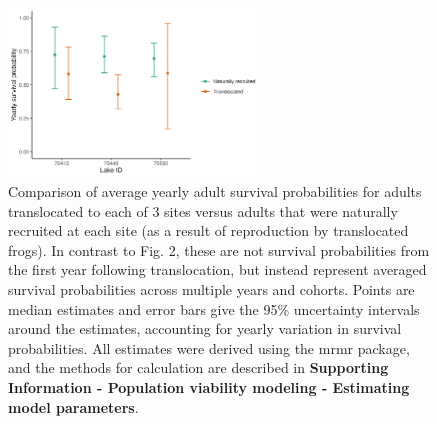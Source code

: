 \documentclass[9pt,twoside,lineno]{pnas-new}
\begin{document}
\begin{figure}

{\centering \includegraphics[width=0.60\textwidth]{figures/compare_surv_probs.jpg}

}

\caption{\label{fig-compare_surv_probs}Comparison of average yearly
adult survival probabilities for adults translocated to each of 3 sites
versus adults that were naturally recruited at each site (as a result of
reproduction by translocated frogs). In contrast to
Fig. 2, these are not survival
probabilities from the first year following translocation, but instead
represent averaged survival probabilities across multiple years and
cohorts. Points are median estimates and error bars give the 95\%
uncertainty intervals around the estimates, accounting for yearly
variation in survival probabilities. All estimates were derived using
the mrmr package, and the methods for calculation are described in
\textbf{Supporting Information - Population viability modeling -
Estimating model parameters}.}

\end{figure}\clearpage

\newpage
\end{document}
